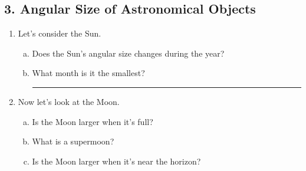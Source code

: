 \documentclass[main.tex]{subfiles}
\begin{document}
\subsection*{3. Angular Size of Astronomical Objects}
\begin{enumerate}
\item Let's consider the Sun.
	\begin{enumerate}[a.]
	\item Does the Sun's angular size changes during the year?
	\item What month is it the smallest? \rule{2cm}{.15mm}
	\end{enumerate}

\item Now let's look at the Moon.
	\begin{enumerate}[a.]
	\item Is the Moon larger when it's full?
	\item What is a supermoon?
	\item Is the Moon larger when it's near the horizon?
	\end{enumerate}

\end{enumerate}
\end{document}

